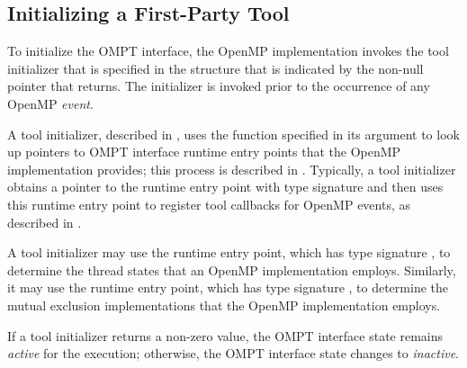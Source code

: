 \subsection{Initializing a First-Party Tool}
\label{sec:tool-initialize}

To initialize the OMPT interface, the OpenMP implementation invokes the tool 
initializer that is specified in the  structure
that is indicated by the non-null pointer that  returns.
The initializer is invoked prior to the occurrence of any OpenMP \emph{event}.

A tool initializer, described in , uses the 
function specified in its  argument to look up pointers to OMPT 
interface runtime entry points that the OpenMP implementation provides; this 
process is described in . Typically, a tool initializer
obtains a pointer to the   runtime entry point with 
type signature  and then uses this runtime entry 
point to register tool callbacks for OpenMP events, as described in 
.

A tool initializer may use the  runtime entry 
point, which has type signature , to determine 
the thread states that an OpenMP implementation employs. Similarly, it may
use the  runtime entry point, which has 
type signature , to determine the mutual
exclusion implementations that the OpenMP implementation employs.

If a tool initializer returns a non-zero value, the OMPT interface state
remains \emph{active} for the execution; otherwise, the OMPT interface state 
changes to \emph{inactive}.

